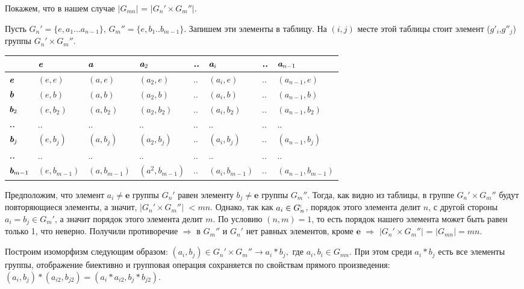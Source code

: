 \documentclass[12pt,a4paper]{article}
\newcommand{\ve}{\boldsymbol{e}}
\begin{document}
Покажем, что в нашем случае $|G_{mn}|$ = $|G_n' \times G_m''| $.

Пусть $G_n' = \lbrace e, a_1 ... a_{n-1} \rbrace$, $G_m'' = \lbrace e, b_1 .. b_{m-1}\rbrace.$ Запишем эти элементы в таблицу. На $(i,j)$ месте этой таблицы стоит элемент ($g'_i$,$g''_j$) группы $G_n' \times G_m''$.


\begin{center}
\begin{tabular}{|l|l|l|l|l|l|l|l|}
\hline
$ $ & $\textit{\textbf{e}}$ & $\textit{\textbf{a}}$ & $\textit{\textbf{a}}_2$ & $\textit{\textbf{..}}$ & $\textit{\textbf{a}}_i$ & $\textit{\textbf{..}}$ & $\textit{\textbf{a}}_{n-1}$\\
\hline
$\textit{\textbf{e}}$ & $(e,e)$ & $(a,e)$ & $(a_2,e)$ & $..$ & $(a_i,e)$ & $..$ & $(a_{n-1},e)$\\
\hline
$\textit{\textbf{b}}$ & $(e,b)$ & $(a,b)$ & $(a_2,b)$ & $..$ & $(a_i,b)$ & $..$ & $(a_{n-1},b)$\\
\hline
$\textit{\textbf{b}}_2$ & $(e,b_2)$ & $(a,b_2)$ & $(a_2,b_2)$ & $..$ & $(a_i,b_2)$ & $..$ & $(a_{n-1},b_2)$\\
\hline
$\textit{\textbf{..}}$ & $..$ & $..$ & $..$ & $..$ & $..$ & $..$ & $..$\\
\hline
$\textit{\textbf{b}}_j$ & $(e,b_j)$ & $(a,b_j)$ & $(a_2,b_j)$ & $..$ & $(a_i,b_j)$ & $..$ & $(a_{n-1},b_j)$\\
\hline
$\textit{\textbf{..}}$ & $..$ & $..$ & $..$ & $..$ & $..$ & $..$ & $..$\\
\hline
$\textit{\textbf{b}}_{m-1}$ & $(e,b_{m-1})$ & $(a,b_{m-1})$ & $(a^2,b_{m-1})$ & $..$ & $(a_i,b_{m-1})$ & $..$ & $(a_{n-1},b_{m-1})$\\
\hline
\end{tabular}
\end{center}


Предположим, что элемент $a_i\neq \ve$ группы $G_n' $ равен элементу $b_j \neq \ve$ группы $G_m''$. Тогда, как видно из таблицы, в группе $G_n' \times G_m''$ будут повторяющиеся элементы, а значит, $|G_n' \times G_m''|$ $< mn$. Однако, так как $a_i \in G_n^ \shortmid$, порядок этого элемента делит $n$, с другой стороны $a_i=b_j \in G_m'$, а значит порядок этого элемента делит $m$. По условию $(n,m)=1$, то есть порядок нашего элемента может быть равен только 1, что неверно. Получили противоречие $\Rightarrow$ в  $G_m''$ и $G_n'$ нет равных элементов, кроме $\ve$ $\Rightarrow$ $|G_n' \times G_m''|$ = $|G_{mn}| = mn.$

Построим изоморфизм следующим образом: $(a_i,b_j) \in G_n' \times G_m'' \longrightarrow a_i \ast b_j,$ где $a_i, b_i \in G_{mn}$. При этом среди $a_i\ast b_j$ есть все элементы группы, отображение биективно и групповая операция сохраняется по свойствам прямого произведения: $(a_i,b_j)\ast (a_{i2},b_{j2})=(a_i \ast a_{i2}, b_j \ast b_{j2}).$
\end{document}
